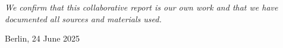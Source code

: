 \chapter*{}
\vspace{17cm}
\hfill\parbox{8cm}{
\raggedleft
\textit{We confirm that this collaborative report is our own work and that we have documented all sources and materials used.}\par 
\vspace{1em}
Berlin, 24 June 2025
}
\thispagestyle{empty}